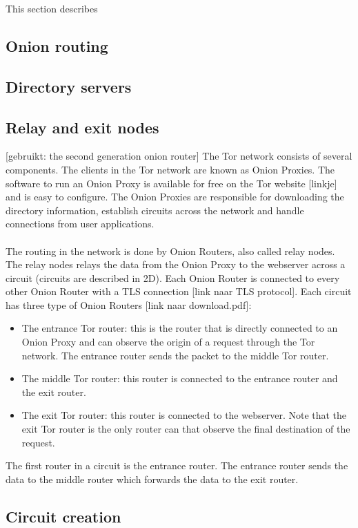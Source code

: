 \documentclass[journal]{IEEEtran}
\begin{document}
		This section describes 
		
		\subsection{Onion routing}
		
		\subsection{Directory servers}
		
		\subsection{Relay and exit nodes}

[gebruikt: the second generation onion router]
The Tor network consists of several components. The clients in the Tor network are known as Onion Proxies. The software to run an Onion Proxy is available for free on the Tor website [linkje] and is easy to configure. The Onion Proxies are responsible for downloading the directory information, establish circuits across the network and handle connections from user applications.\\\\
The routing in the network is done by Onion Routers, also called relay nodes. The relay nodes relays the data from the Onion Proxy to the webserver across a circuit (circuits are described in 2D). Each Onion Router is connected to every other Onion Router with a TLS connection [link naar TLS protocol]. Each circuit has three type of Onion Routers [link naar download.pdf]:\begin{itemize}
\item The entrance Tor router: this is the router that is directly connected to an Onion Proxy and can observe the origin of a request through the Tor network. The entrance router sends the packet to the middle Tor router.
\item The middle Tor router: this router is connected to the entrance router and the exit router.
\item The exit Tor router: this router is connected to the webserver. Note that the exit Tor router is the only router can that observe the final destination of the request.
\end{itemize}
The first router in a circuit is the entrance router. The entrance router sends the data to the middle router which forwards the data to the exit router.
		
		\subsection{Circuit creation}
\end{document}
